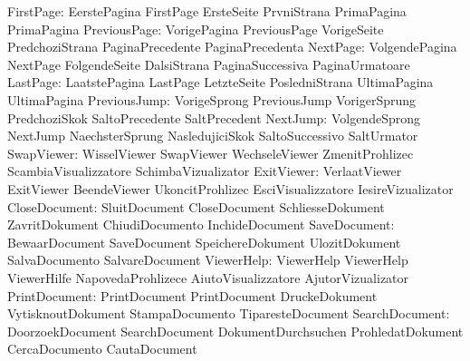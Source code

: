                 FirstPage: EerstePagina              FirstPage
                           ErsteSeite                PrvniStrana
                           PrimaPagina               PrimaPagina
             PreviousPage: VorigePagina              PreviousPage
                           VorigeSeite               PredchoziStrana
                           PaginaPrecedente          PaginaPrecedenta
                 NextPage: VolgendePagina            NextPage
                           FolgendeSeite             DalsiStrana
                           PaginaSuccessiva          PaginaUrmatoare
                 LastPage: LaatstePagina             LastPage
                           LetzteSeite               PosledniStrana
                           UltimaPagina              UltimaPagina
             PreviousJump: VorigeSprong              PreviousJump
                           VorigerSprung             PredchoziSkok
                           SaltoPrecedente           SaltPrecedent
                 NextJump: VolgendeSprong            NextJump
                           NaechsterSprung           NasledujiciSkok
                           SaltoSuccessivo           SaltUrmator
               SwapViewer: WisselViewer              SwapViewer
                           WechseleViewer            ZmenitProhlizec
                           ScambiaVisualizzatore     SchimbaVizualizator
               ExitViewer: VerlaatViewer             ExitViewer
                           BeendeViewer              UkoncitProhlizec
                           EsciVisualizzatore        IesireVizualizator
            CloseDocument: SluitDocument             CloseDocument
                           SchliesseDokument         ZavritDokument
                           ChiudiDocumento           InchideDocument
             SaveDocument: BewaarDocument            SaveDocument
                           SpeichereDokument         UlozitDokument
                           SalvaDocumento            SalvareDocument
               ViewerHelp: ViewerHelp                ViewerHelp
                           ViewerHilfe               NapovedaProhlizece
                           AiutoVisualizzatore       AjutorVizualizator
            PrintDocument: PrintDocument             PrintDocument
                           DruckeDokument            VytisknoutDokument
                           StampaDocumento           TiparesteDocument
           SearchDocument: DoorzoekDocument          SearchDocument
                           DokumentDurchsuchen       ProhledatDokument
                           CercaDocumento            CautaDocument

